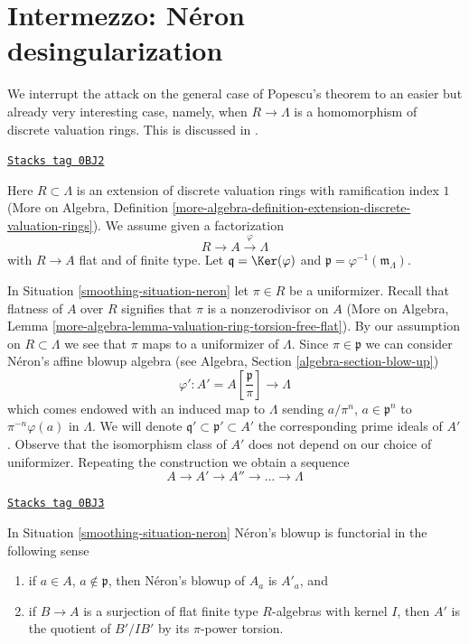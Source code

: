 \section{Intermezzo: N\'eron desingularization}
\label{smoothing-section-neron}
We interrupt the attack on the general case of Popescu's theorem to
an easier but already very interesting case, namely, when
$R \to \Lambda$ is a homomorphism of discrete valuation rings.
This is discussed in
\cite[Section 4]{Artin-Algebraic-Approximation}.

\begin{definition}
\label{smoothing-situation-neron}
\href{https://stacks.math.columbia.edu/tag/0BJ2}{\texttt{Stacks tag 0BJ2}}

Here $R \subset \Lambda$ is an extension of discrete valuation rings
with ramification index $1$ (More on Algebra, Definition
\ref{more-algebra-definition-extension-discrete-valuation-rings}).
We assume given a factorization
$$
R \to A \xrightarrow{\varphi} \Lambda
$$
with $R \to A$ flat and of finite type. Let $\mathfrak q = \Ker(\varphi)$
and $\mathfrak p = \varphi^{-1}(\mathfrak m_\Lambda)$.
\end{definition}

In Situation \ref{smoothing-situation-neron} let $\pi \in R$ be a uniformizer.
Recall that flatness of $A$ over $R$ signifies that $\pi$
is a nonzerodivisor on $A$
(More on Algebra, Lemma
\ref{more-algebra-lemma-valuation-ring-torsion-free-flat}).
By our assumption on $R \subset \Lambda$ we see that $\pi$ maps
to a uniformizer of $\Lambda$. Since $\pi \in \mathfrak p$ we can consider
N\'eron's affine blowup algebra (see
Algebra, Section \ref{algebra-section-blow-up})
$$
\varphi' :
A' = A[\textstyle{\frac{\mathfrak p}{\pi}}]
\longrightarrow
\Lambda
$$
which comes endowed with an induced map to $\Lambda$ sending
$a/\pi^n$, $a \in \mathfrak p^n$ to $\pi^{-n}\varphi(a)$ in $\Lambda$.
We will denote $\mathfrak q' \subset \mathfrak p' \subset A'$
the corresponding prime ideals of $A'$. Observe that the isomorphism
class of $A'$ does not depend on our choice of uniformizer.
Repeating the construction we obtain a sequence
$$
A \to A' \to A'' \to \ldots \to \Lambda
$$

\begin{lemma}
\label{smoothing-lemma-neron-functorial}
\href{https://stacks.math.columbia.edu/tag/0BJ3}{\texttt{Stacks tag 0BJ3}}

In Situation \ref{smoothing-situation-neron} N\'eron's blowup is functorial
in the following sense
\begin{enumerate}
\item if $a \in A$, $a \not \in \mathfrak p$, then N\'eron's blowup
of $A_a$ is $A'_a$, and
\item if $B \to A$ is a surjection of flat finite type $R$-algebras
with kernel $I$, then $A'$ is the quotient of $B'/IB'$ by its
$\pi$-power torsion.
\end{enumerate}
\end{lemma}

